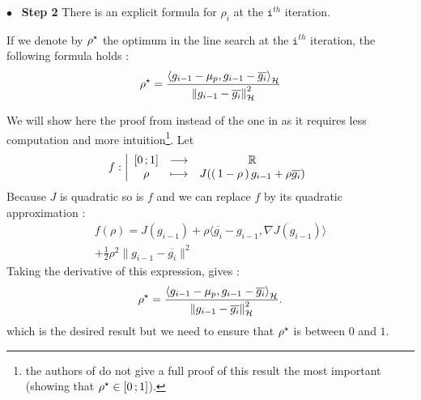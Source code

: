 {$\bullet$~\normalfont\bfseries\color{myorange!90!black} Step 2 } There is an
 explicit formula for $\rho_i$ at the $\texttt{i}^{th}$ iteration.

 \begin{boxtheorem}
If we denote by $\ropt$ the optimum in the line search at the $\texttt{i}^{th}$
iteration, the following formula holds :
\begin{equation}
\ropt = \frac { \left\langle g _ { i - 1 } - \mu _ { p } , g _ { i - 1 } - \overline{g_i} \right\rangle _ { \mathcal { H } } } { \left\| g _ { i - 1 } - \overline{g_i} \right\| _ { \mathcal { H } } ^ { 2 } }
\end{equation}
 \end{boxtheorem}
  We will show here the proof from \cite{Beck} instead of the one in \cite{FWBQ}
  as it requires less computation and more intuition\footnote{the authors of \cite{FWBQ} do not give a full proof of this result the most important (showing that $\ropt \in \intff{0}{1}$).}. Let
  \begin{equation*}
    f : \left| \begin{array} { c c c } { \mathopen{[}0\mathpunct{};1\mathclose{]} } & { \longrightarrow } & { \mathbb { R } } \\ { \rho } & { \longmapsto } & { J(\left( \, 1-\rho \, \right)g_{i-1}+\rho{\overline{g_i}}) } \end{array} \right.
\end{equation*}
Because $J$ is quadratic so is $f$ and we can replace $f$ by its quadratic approximation :
\begin{equation*}
  \begin{split}
    f(\rho) = J ( g_{i-1} ) + \rho \langle \overline{g_i}- g_{i-1} , \nabla J ( g_{i-1} ) \rangle \\ + \frac { 1 } { 2 } \rho ^ { 2 } \|  g_{i-1} - \overline{g_i} \| ^ { 2 }
  \end{split}
\end{equation*}
Taking the derivative of this expression, gives :
\begin{equation*}
  \ropt =   \frac { \left\langle g _ { i - 1 } - \mu _ { p } , g _ { i - 1 } - \overline{g_i} \right\rangle _ { \mathcal { H } } } { \left\| g _ { i - 1 } - \overline{g_i} \right\| _ { \mathcal { H } } ^ { 2 } }.
\end{equation*}
which is the desired result but we need to ensure that $\ropt$ is between $0$ and
 $1$.

